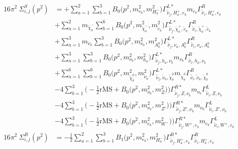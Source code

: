 \begin{itemize}
\begin{align} 
16\pi^2 \ \Sigma^S_{i,j}(p^2) &= +\sum_{a=1}^{2}\sum_{b=1}^{3}{B_0\Big(p^{2},m^2_{e_{{b}}},m^2_{H^-_{{a}}}\Big)} {\Gamma^{L*}_{\check{\bar{\nu}}_{{j}},H^+_{{a}},e_{{b}}}} m_{e_{{b}}} {\Gamma^R_{\check{\bar{\nu}}_{{i}},H^+_{{a}},e_{{b}}}} \nonumber \\ 
 &+\sum_{a=1}^{2}m_{\tilde{\chi}^-_{{a}}} \sum_{b=1}^{6}{B_0\Big(p^{2},m^2_{\tilde{\chi}^-_{{a}}},m^2_{\tilde{e}_{{b}}}\Big)} {\Gamma^{L*}_{\check{\bar{\nu}}_{{j}},\tilde{\chi}^+_{{a}},\tilde{e}_{{b}}}} {\Gamma^R_{\check{\bar{\nu}}_{{i}},\tilde{\chi}^+_{{a}},\tilde{e}_{{b}}}}  \nonumber \\ 
 &+\sum_{a=1}^{3}m_{\nu_{{a}}} \sum_{b=1}^{3}{B_0\Big(p^{2},m^2_{\nu_{{a}}},m^2_{A^0_{{b}}}\Big)} {\Gamma^{L*}_{\check{\bar{\nu}}_{{j}},\nu_{{a}},A^0_{{b}}}} {\Gamma^R_{\check{\bar{\nu}}_{{i}},\nu_{{a}},A^0_{{b}}}}  \nonumber \\ 
 &+\sum_{a=1}^{3}\sum_{b=1}^{3}{B_0\Big(p^{2},m^2_{\nu_{{b}}},m^2_{h_{{a}}}\Big)} {\Gamma^{L*}_{\check{\bar{\nu}}_{{j}},h_{{a}},\nu_{{b}}}} m_{\nu_{{b}}} {\Gamma^R_{\check{\bar{\nu}}_{{i}},h_{{a}},\nu_{{b}}}} \nonumber \\ 
 &+\sum_{a=1}^{6}\sum_{b=1}^{6}{B_0\Big(p^{2},m^2_{\tilde{\chi}^0_{{b}}},m^2_{\tilde{\nu}_{{a}}}\Big)} {\Gamma^{L*}_{\check{\bar{\nu}}_{{j}},\tilde{\nu}_{{a}},\tilde{\chi}^0_{{b}}}} m_{\tilde{\chi}^0_{{b}}} {\Gamma^R_{\check{\bar{\nu}}_{{i}},\tilde{\nu}_{{a}},\tilde{\chi}^0_{{b}}}} \nonumber \\ 
 &-4 \sum_{b=1}^{3}\Big(-\frac{1}{2} \text{rMS}  + {B_0\Big(p^{2},m^2_{\nu_{{b}}},m^2_{Z}\Big)}\Big){\Gamma^{R*}_{\check{\bar{\nu}}_{{j}},Z,\nu_{{b}}}} m_{\nu_{{b}}} {\Gamma^L_{\check{\bar{\nu}}_{{i}},Z,\nu_{{b}}}}  \nonumber \\ 
 &-4 \sum_{b=1}^{3}\Big(-\frac{1}{2} \text{rMS}  + {B_0\Big(p^{2},m^2_{\nu_{{b}}},m^2_{{Z'}}\Big)}\Big){\Gamma^{R*}_{\check{\bar{\nu}}_{{j}},{Z'},\nu_{{b}}}} m_{\nu_{{b}}} {\Gamma^L_{\check{\bar{\nu}}_{{i}},{Z'},\nu_{{b}}}}  \nonumber \\ 
 &-4 \sum_{b=1}^{3}\Big(-\frac{1}{2} \text{rMS}  + {B_0\Big(p^{2},m^2_{e_{{b}}},m^2_{W^-}\Big)}\Big){\Gamma^{R*}_{\check{\bar{\nu}}_{{j}},W^+,e_{{b}}}} m_{e_{{b}}} {\Gamma^L_{\check{\bar{\nu}}_{{i}},W^+,e_{{b}}}}  \\ 
16\pi^2 \ \Sigma^R_{i,j}(p^2) &= -\frac{1}{2} \sum_{a=1}^{2}\sum_{b=1}^{3}{B_1\Big(p^{2},m^2_{e_{{b}}},m^2_{H^-_{{a}}}\Big)} {\Gamma^{R*}_{\check{\bar{\nu}}_{{j}},H^+_{{a}},e_{{b}}}} {\Gamma^R_{\check{\bar{\nu}}_{{i}},H^+_{{a}},e_{{b}}}}  \nonumber \\ 

\end{align}
\end{itemize}
